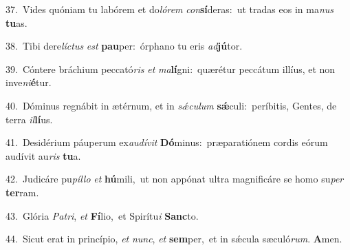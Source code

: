 {\numbfont\textcolor{\numbcolor}{37.}}~Vides quóniam tu labórem et do\-\textit{ló}\-\textit{rem} \textit{con}\-\textbf{sí}deras:~\star ut tradas eos in ma\textit{nus} \textbf{tu}\-as.\par
{\numbfont\textcolor{\numbcolor}{38.}}~Tibi dere\-\textit{líc}\-\textit{tus} \textit{est} \textbf{pau}\-per:~\star órphano tu eris \textit{ad}\-\textbf{jú}tor.\par
{\numbfont\textcolor{\numbcolor}{39.}}~Cóntere bráchium peccató\textit{ris} \textit{et} \textit{ma}\-\textbf{lí}gni:~\star quærétur peccátum illíus, et non inve\-\textit{ni}\-\textbf{é}tur.\par
{\numbfont\textcolor{\numbcolor}{40.}}~Dóminus regnábit in ætérnum, et in \textit{sǽ}\-\textit{cu}\textit{lum} \textbf{sǽ}\-culi:~\star períbitis, Gentes, de terra \textit{il}\-\textbf{lí}us.\par
{\numbfont\textcolor{\numbcolor}{41.}}~Desidérium páuperum ex\-\textit{au}\-\textit{dí}\textit{vit} \textbf{Dó}\-minus:~\star præparatiónem cordis eórum audívit au\textit{ris} \textbf{tu}\-a.\par
{\numbfont\textcolor{\numbcolor}{42.}}~Judicáre pu\-\textit{píl}\-\textit{lo} \textit{et} \textbf{hú}\-mili,~\star ut non appónat ultra magnificáre se homo su\textit{per} \textbf{ter}\-ram.\par
{\numbfont\textcolor{\numbcolor}{43.}}~Glória \textit{Pa}\-\textit{tri}, \textit{et} \textbf{Fí}\-lio,~\star et Spirítu\textit{i} \textbf{Sanc}\-to.\par
{\numbfont\textcolor{\numbcolor}{44.}}~Sicut erat in princípio, \textit{et} \textit{nunc}\-, \textit{et} \textbf{sem}\-per,~\star et in sǽcula sæculó\-\textit{rum}\-. \textbf{A}\-men.\par
